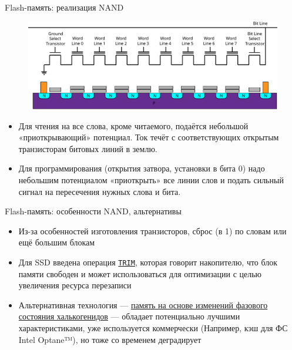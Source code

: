\documentclass[xetex,aspectratio=43]{beamer}
\begin{document}
\begin{frame}{Flash-память: реализация NAND}
    \begin{figure}
        \includegraphics[height=0.25\textheight]{img/09.nand.pdf}
    \end{figure}

    \begin{itemize}
        \tightlist
        \item
        Для чтения на все слова, кроме читаемого, подаётся небольшой
        «приоткрывающий» потенциал. Ток течёт с соответствующих открытым
        транзисторам битовых линий в землю.
        \item
        Для программирования (открытия затвора, установки в бита 0) надо
        небольшим потенциалом «приоткрыть» все линии слов и подать сильный
        сигнал на пересечения нужных слова и бита.
    \end{itemize}
\end{frame}

\begin{frame}[fragile]{Flash-память: особенности NAND, альтернативы}
    \begin{itemize}
        \tightlist
        \item
        Из-за особенностей изготовления транзисторов, сброс (в 1) по словам
        или ещё большим блокам
        \item
        Для SSD введена операция
        \href{https://ru.wikipedia.org/wiki/TRIM}{\texttt{TRIM}}, которая
        говорит накопителю, что блок памяти свободен и может использоваться
        для оптимизации с целью увеличения ресурса перезаписи

        \pause

        \item
        Альтернативная технология ---
        \href{https://en.wikipedia.org/wiki/Phase-change_memory\#Challenges}{память
            на основе изменений фазового состояния халькогенидов} --- обладает
        потенциально лучшими характеристиками, уже используется коммерчески
        (Например, кэш для ФС Intel Optane™), но тоже со временем деградирует
    \end{itemize}

\end{frame}
\end{document}
